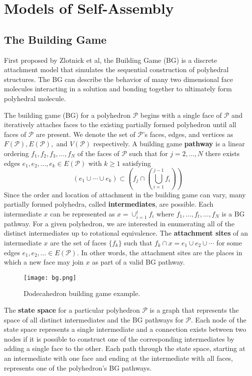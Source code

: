 \documentclass[12pt]{article}
\begin{document}
\section{Models of Self-Assembly}
\subsection{The Building Game}

First proposed by Zlotnick et al, the Building Game (BG) is a discrete attachment model that simulates the sequential construction of polyhedral structures. The BG can describe the behavior of many two dimensional face molecules interacting in a solution and bonding together to ultimately form polyhedral molecule.

 The building game (BG) for a polyhedron $\mathcal{P}$ begins with a single face of $\mathcal{P}$ and iteratively attaches faces to the existing partially formed polyhedron until all faces of $\mathcal{P}$ are present. We denote the set of $\mathcal{P}$'s faces, edges, and vertices as $F(\mathcal{P}),E(\mathcal{P}),$ and $V(\mathcal{P})$ respectively. A building game \textbf{pathway} is a linear ordering $f_1,f_2,f_3,\ldots,f_N$ of the faces of $\mathcal{P}$ such that for $j = 2,\ldots,N$ there exists edges $e_1,e_2,\ldots,e_k \in E(\mathcal{P})$ with  $k \geq 1$ satisfying
$$\left(e_1\cup\cdots\cup e_k \right)\subset \left(f_j\cap\left(\bigcup_{i=1}^{j-1}f_i\right)\right)$$
Since the order and location of attachment in the building game can vary, many partially formed polyhedra, called \textbf{intermediates}, are possible. Each intermediate $x$ can be represented as $x = \cup_{i=1}^tf_i$ where $f_1,\ldots,f_t,\ldots,f_N$ is a BG pathway. For a given polyhedron, we are interested in enumerating all of the distinct intermediates up to rotational equivalence. The  \textbf{attachment sites} of an intermediate $x$ are the set of faces $\{f_k\}$ such that $f_k\cap x = e_1\cup e_2 \cup \cdots$ for some edges $e_1,e_2,\ldots \in E(\mathcal{P})$. In other words, the attachment sites are the places in which a new face may join $x$ as part of a valid BG pathway.

\begin{figure}[!h]
\centering
\texttt{[image: bg.png]}
\caption{Dodecahedron building game example.}
\label{fig:bg}
\end{figure}

The \textbf{state space} for a particular polyhedron $\mathcal{P}$ is a graph that represents the space of all distinct intermediates and the BG pathways for $\mathcal{P}$. Each node of the state space represents a single intermediate and a connection exists between two nodes if it is possible to construct one of the corresponding intermediates by adding a single face to the other. Each path through the state space, starting at an intermediate with one face and ending at the intermediate with all faces, represents one of the polyhedron's BG pathways. 
\end{document}
